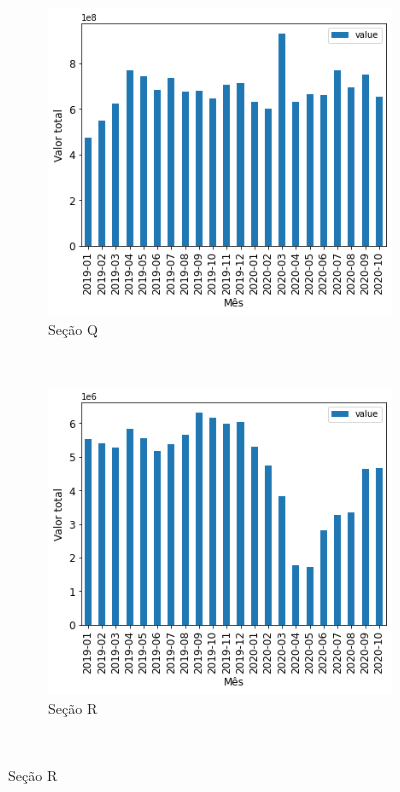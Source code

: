 \begin{figure}[htb]
\begin{subfigure}[b]{0.45\textwidth}
        \includegraphics[scale=0.45]{images/base-de-dados-16.Q-valor-mensal-por-secao.png}
        \caption{Seção Q}
        \label{fig:pandemia:descritiva-16.Q-valor-mensal-por-secao}
    \end{subfigure} ~ \quad
    \begin{subfigure}[b]{0.45\textwidth}
        \includegraphics[scale=0.45]{images/base-de-dados-16.R-valor-mensal-por-secao.png}
        \caption{Seção R}
        \label{fig:pandemia:descritiva-16.R-valor-mensal-por-secao}
    \end{subfigure} ~ \\
    \fautor
\end{figure}

